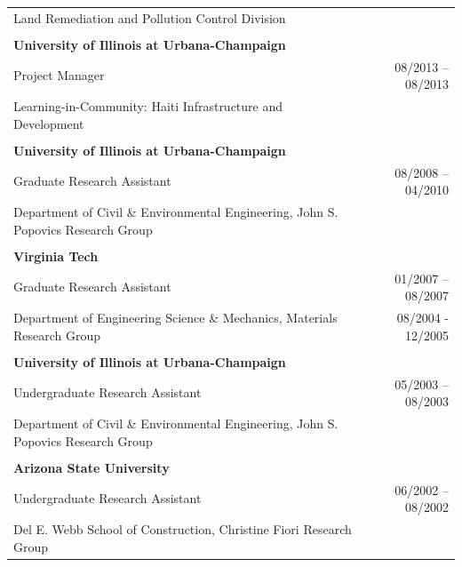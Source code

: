 \documentclass{article}[12pt]
\begin{document}
\begin{tabularx}{\textwidth}{Xr}
			Land Remediation and Pollution Control Division  & \\
			\\
			\textbf{University of Illinois at Urbana-Champaign} \\ %
			Project Manager & 08/2013 -- 08/2013 \\
			Learning-in-Community: Haiti Infrastructure and Development  & \\
			\\
			\textbf{University of Illinois at Urbana-Champaign} \\ %
			Graduate Research Assistant & 08/2008 -- 04/2010 \\
			Department of Civil \& Environmental Engineering, John S. Popovics Research Group & \\
			\\
			\textbf{Virginia Tech} \\ %
			Graduate Research Assistant & 01/2007 -- 08/2007 \\
			Department of Engineering Science \& Mechanics, Materials Research Group & 08/2004 - 12/2005\\
			\\
			\textbf{University of Illinois at Urbana-Champaign} \\ %
			Undergraduate Research Assistant & 05/2003 -- 08/2003 \\
			Department of Civil \& Environmental Engineering, John S. Popovics Research Group & \\
			\\
			\textbf{Arizona State University}\\ %
			Undergraduate Research Assistant & 06/2002 -- 08/2002 \\
			Del E. Webb School of Construction, Christine Fiori Research Group & \\
			
		\end{tabularx}
		
		
		
\end{document}
